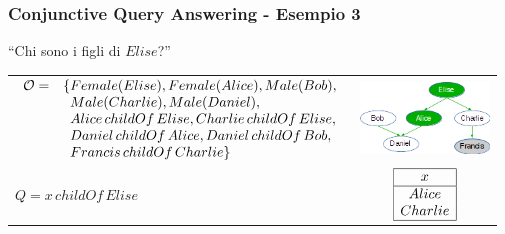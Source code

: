 \documentclass[8pt]{beamer}
\begin{document}
\begin{frame}
\frametitle{Conjunctive Query Answering - Esempio 3}
\begin{center}
``Chi sono i figli di $Elise$?''
\end{center}

\begin{tabular}{lc}
$\begin{array}{cl}
  \Ont  =  &  \{Female(Elise),  Female(Alice), Male(Bob), \\
  &\phantom{\{}Male(Charlie), Male(Daniel), \\
  &\phantom{\{}Alice\,childOf\,Elise, Charlie\,childOf\,Elise, \\
  &\phantom{\{}Daniel\,childOf\,Alice, Daniel\,childOf\,Bob, \\
  &\phantom{\{}Francis\,childOf\,Charlie \}\\
\end{array}$ & \includegraphics[width=130px]{family.png} \\
$Q=x\,childOf\,Elise$ &
$\begin{array}{|c|}
  \hline
  x\\
  \hline
  Alice\\
  Charlie\\
  \hline
\end{array}$ \\
\end{tabular}
\end{frame}
\end{document}
